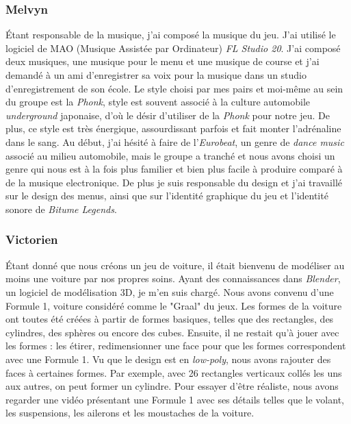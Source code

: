 \documentclass[a4paper,12pt]{article}
\newcommand{\btmlgs}{\textsl{Bitume Legends}}
\begin{document}
    \subsubsection{Melvyn}
        Étant responsable de la musique, j'ai composé la 
        musique du jeu. J'ai utilisé le logiciel de MAO (Musique Assistée par Ordinateur) 
        \textsl{FL Studio 20}. J'ai composé deux musiques, une musique pour le menu et 
        une musique de course et j'ai demandé à un ami d'enregistrer sa voix pour la musique
        dans un studio d'enregistrement de son école. Le style choisi par mes pairs et moi-même
        au sein du groupe est la \textsl{Phonk}, style est souvent associé à la culture automobile
        \textit{underground} japonaise, d'où le désir d'utiliser de la \textsl{Phonk} pour notre jeu. 
        De plus, ce style est très énergique, assourdissant parfois et fait monter l'adrénaline
        dans le sang. Au début, j'ai hésité à faire de l'\textit{Eurobeat}, un genre de \textit{dance music}
        associé au milieu automobile, mais le groupe a tranché et nous avons choisi un genre qui
        nous est à la fois plus familier et bien plus facile à produire comparé à de la musique
        electronique. De plus je suis responsable du design et j'ai travaillé sur le design des
        menus, ainsi que sur l'identité graphique du jeu et l'identité sonore de \btmlgs.

    \subsubsection{Victorien}
        Étant donné que nous créons un jeu de voiture, il était 
        bienvenu de modéliser au moins une voiture par nos propres soins. 
        Ayant des connaissances dans \textsl{Blender}, un logiciel 
        de modélisation 3D, je m'en suis chargé. 
        Nous avons convenu d'une Formule 1, voiture considéré comme le "Graal" du jeux. 
        Les formes de la voiture ont toutes été créées à partir de formes basiques,
        telles que des rectangles, des cylindres, des sphères ou encore des cubes. 
        Ensuite, il ne restait qu'à jouer avec les formes : les étirer, 
        redimensionner une face pour que les formes correspondent avec une Formule 1. 
        Vu que le design est en \textit{low-poly}, nous avons rajouter des
        faces à certaines formes. Par exemple, avec 26 rectangles verticaux collés les 
        uns aux autres, on peut former un cylindre.
        Pour essayer d'être réaliste, nous avons regarder une 
        vidéo présentant une Formule 1 avec ses détails telles que le volant, 
        les suspensions, les ailerons et les moustaches de la voiture.
\end{document}
